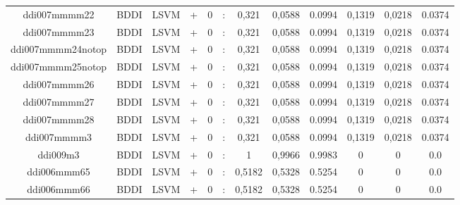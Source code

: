 \documentclass[a4paper]{article}
\begin{document}
\begin{landscape}
\begin{center}
\begin{tabular}{ |c|c|c|c|c|c|c|c|c|c|c|c|}
 
 	
 	\small{ ddi007mmmm22 } & BDDI & LSVM & +  &  0 &  :  &  0,321 & 0,0588 & 0.0994  &  0,1319 & 0,0218 & 0.0374 \\
 	

 
 	
 	\small{ ddi007mmmm23 } & BDDI & LSVM & +  &  0 &  :  &  0,321 & 0,0588 & 0.0994  &  0,1319 & 0,0218 & 0.0374 \\
 	

 
 	
 	\small{ ddi007mmmm24notop } & BDDI & LSVM & +  &  0 &  :  &  0,321 & 0,0588 & 0.0994  &  0,1319 & 0,0218 & 0.0374 \\
 	

 
 	
 	\small{ ddi007mmmm25notop } & BDDI & LSVM & +  &  0 &  :  &  0,321 & 0,0588 & 0.0994  &  0,1319 & 0,0218 & 0.0374 \\
 	

 
 	
 	\small{ ddi007mmmm26 } & BDDI & LSVM & +  &  0 &  :  &  0,321 & 0,0588 & 0.0994  &  0,1319 & 0,0218 & 0.0374 \\
 	

 
 	
 	\small{ ddi007mmmm27 } & BDDI & LSVM & +  &  0 &  :  &  0,321 & 0,0588 & 0.0994  &  0,1319 & 0,0218 & 0.0374 \\
 	

 
 	
 	\small{ ddi007mmmm28 } & BDDI & LSVM & +  &  0 &  :  &  0,321 & 0,0588 & 0.0994  &  0,1319 & 0,0218 & 0.0374 \\
 	

 
 	
 	\small{ ddi007mmmm3 } & BDDI & LSVM & +  &  0 &  :  &  0,321 & 0,0588 & 0.0994  &  0,1319 & 0,0218 & 0.0374 \\
 	

 
 	
 	\small{ ddi009m3 } & BDDI & LSVM & +  &  0 &  :  &  1 & 0,9966 & 0.9983  &  0 & 0 & 0.0 \\
 	

 
 	
 	\small{ ddi006mmm65 } & BDDI & LSVM & +  &  0 &  :  &  0,5182 & 0,5328 & 0.5254  &  0 & 0 & 0.0 \\
 	

 
 	
 	\small{ ddi006mmm66 } & BDDI & LSVM & +  &  0 &  :  &  0,5182 & 0,5328 & 0.5254  &  0 & 0 & 0.0 \\
 	


\end{tabular}
\end{center}
\end{landscape}
\end{document}
